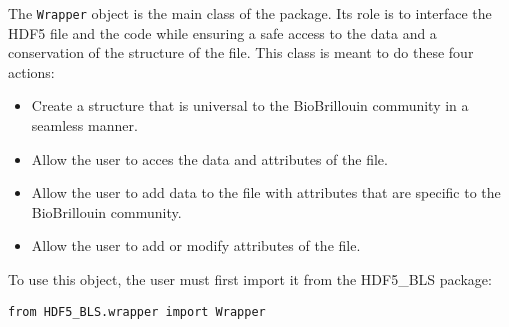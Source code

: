 The \texttt{Wrapper} object is the main class of the package. Its role is to interface the HDF5 file and the code while ensuring a safe access to the data and a conservation of the structure of the file. This class is meant to do these four actions:
\begin{itemize}
    \item Create a structure that is universal to the BioBrillouin community in a seamless manner.
    \item Allow the user to acces the data and attributes of the file.
    \item Allow the user to add data to the file with attributes that are specific to the BioBrillouin community.
    \item Allow the user to add or modify attributes of the file.
\end{itemize}

To use this object, the user must first import it from the HDF5\_BLS package:
\begin{lstlisting}
from HDF5_BLS.wrapper import Wrapper
\end{lstlisting}


